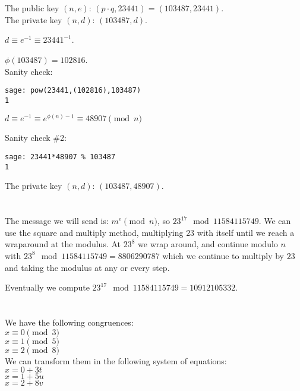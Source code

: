 \documentclass{article}
\begin{document}
\section{}
The public key $(n, e)$: $(p \cdot q, 23441) = (103487, 23441)$.
\\
The private key $(n, d)$: $(103487, d)$.

$d \equiv e^{-1} \equiv 23441^{-1}$. %

$\phi(103487) = 102816 $. \\
Sanity check:
\begin{verbatim}
sage: pow(23441,(102816),103487)
1
\end{verbatim}
$d \equiv e^{-1} \equiv e^{\phi(n)-1}  \equiv 48907 \pmod n$

Sanity check \#2:
\begin{verbatim}
sage: 23441*48907 % 103487
1
\end{verbatim}

The private key $(n, d)$: $(103487, 48907)$.

\section{}
The message we will send is: $m^e \pmod n$, so $23^{17} \mod 11584115749$.
We can use the square and multiply method, multiplying $23$ with itself until we reach a wraparound at the modulus.
At $23^8$ we wrap around, and continue modulo $n$ with $23^8 \mod 11584115749 = 8806290787$ which we continue to multiply by $23$ and taking the modulus at any or every step.

Eventually we compute $23^{17} \mod 11584115749 = 10912105332$.


\section{}

We have the following congruences:
\\
\noindent
$x \equiv 0 \pmod 3$ \\
$x \equiv 1 \pmod 5$ \\
$x \equiv 2 \pmod 8$ \\

\noindent
We can transform them in the following system of equations:
\\
\noindent
$ x = 0 + 3t$ \\
$ x = 1 + 5u$ \\
$ x = 2 + 8v$ \\
\end{document}
